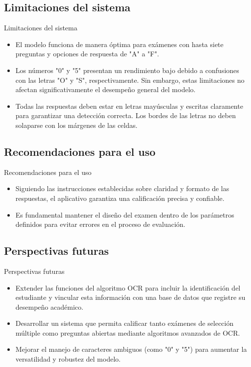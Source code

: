 \documentclass{beamer}
\begin{document}
\subsection{Limitaciones del sistema}
\begin{frame}{Limitaciones del sistema}
    \begin{itemize}
    \item El modelo funciona de manera óptima para exámenes con hasta siete preguntas y opciones de respuesta de "A" a "F".
    \item Los números "0" y "5" presentan un rendimiento bajo debido a confusiones con las letras "O" y "S", respectivamente. Sin embargo, estas limitaciones no afectan significativamente el desempeño general del modelo.
    \item Todas las respuestas deben estar en letras mayúsculas y escritas claramente para garantizar una detección correcta. Los bordes de las letras no deben solaparse con los márgenes de las celdas.
    \end{itemize}
\end{frame}


\subsection{Recomendaciones para el uso}
\begin{frame}{Recomendaciones para el uso}
    \begin{itemize}
        \item Siguiendo las instrucciones establecidas sobre claridad y formato de las respuestas, el aplicativo garantiza una calificación precisa y confiable.
        \item Es fundamental mantener el diseño del examen dentro de los parámetros definidos para evitar errores en el proceso de evaluación.

    \end{itemize}
\end{frame}


\subsection{Perspectivas futuras}
\begin{frame}{Perspectivas futuras}
    \begin{itemize}
        \item Extender las funciones del algoritmo OCR para incluir la identificación del estudiante y vincular esta información con una base de datos que registre su desempeño académico.
        \item Desarrollar un sistema que permita calificar tanto exámenes de selección múltiple como preguntas abiertas mediante algoritmos avanzados de OCR.
        \item Mejorar el manejo de caracteres ambiguos (como "0" y "5") para aumentar la versatilidad y robustez del modelo.
    \end{itemize}
\end{frame}
\end{document}
